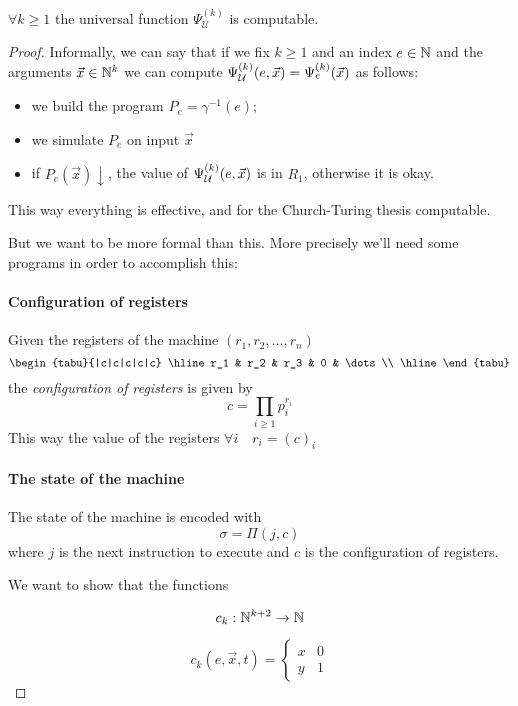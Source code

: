 \begin{theorem}
  $\forall k \geq 1$ the universal function $\Psi_{\mathcal{U}}^{(k)}$
  is computable.

  \begin{proof}
    Informally, we can say that if we fix $k \geq 1$ and an index
    $e \in \mathbb{N}$ and the arguments $\vec{x} \in \mathbb{N}^k$ we can compute
    $\Psi_{\mathcal{U}}^{(k)} (e, \vec{x}) = \Psi_e^{(k)} (\vec{x})$ as follows:
    \begin{itemize}
    \item we build the program $P_e = \gamma^{-1}(e)$;
    \item we simulate $P_e$ on input $\vec{x}$
    \item if $P_e(\vec{x})\downarrow$, the value of $\Psi_{\mathcal{U}}^{(k)} (e, \vec{x})$ is in
      $R_1$, otherwise it is okay.
    \end{itemize}
    This way everything is effective, and for the Church-Turing
    thesis computable.

    But we want to be more formal than this. More precisely we'll need
    some programs in order to accomplish this:

    \paragraph{Configuration of registers}
    Given the registers of the machine $(r_1, r_2, \dots, r_n)$
    \[
      \begin{tabu}{|c|c|c|c|c}
        \hline
        r_1 & r_2 & r_3 & 0 & \dots \\ \hline
      \end{tabu}
    \]
    the \textit{configuration of registers} is given by
    \[ c = \prod_{i \geq 1} p_i^{r_i} \]
    This way the value of the registers $\forall i \quad r_i = (c)_i$

    \paragraph{The state of the machine}
    The state of the machine is encoded with \[ \sigma = \Pi(j, c) \]
    where $j$ is the next instruction to execute and $c$ is the
    configuration of registers.

    We want to show that the functions

    \[
      c_k : \mathbb{N}^{k+2} \rightarrow \mathbb{N}
    \]

    \[
      c_k(e, \vec{x}, t) = \begin{cases}
        x & 0 \\
        y & 1
      \end{cases}
    \]


\end{proof}
\end{theorem}
